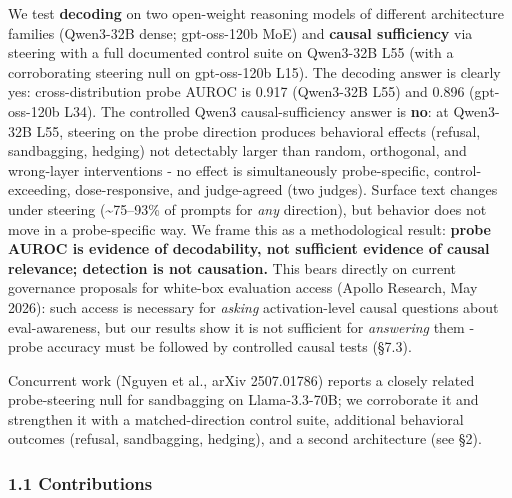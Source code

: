 \documentclass[
]{article}
\begin{document}
We test \textbf{decoding} on two open-weight reasoning models of
different architecture families (Qwen3-32B dense; gpt-oss-120b MoE) and
\textbf{causal sufficiency} via steering with a full documented control
suite on Qwen3-32B L55 (with a corroborating steering null on
gpt-oss-120b L15). The decoding answer is clearly yes:
cross-distribution probe AUROC is 0.917 (Qwen3-32B L55) and 0.896
(gpt-oss-120b L34). The controlled Qwen3 causal-sufficiency answer is
\textbf{no}: at Qwen3-32B L55, steering on the probe direction produces
behavioral effects (refusal, sandbagging, hedging) not detectably larger
than random, orthogonal, and wrong-layer interventions - no effect is
simultaneously probe-specific, control-exceeding, dose-responsive, and
judge-agreed (two judges). Surface text changes under steering
(\textasciitilde75--93\% of prompts for \emph{any} direction), but
behavior does not move in a probe-specific way. We frame this as a
methodological result: \textbf{probe AUROC is evidence of decodability,
not sufficient evidence of causal relevance; detection is not
causation.} This bears directly on current governance proposals for
white-box evaluation access (Apollo Research, May 2026): such access is
necessary for \emph{asking} activation-level causal questions about
eval-awareness, but our results show it is not sufficient for
\emph{answering} them - probe accuracy must be followed by controlled
causal tests (§7.3).

Concurrent work (Nguyen et al., arXiv 2507.01786) reports a closely
related probe-steering null for sandbagging on Llama-3.3-70B; we
corroborate it and strengthen it with a matched-direction control suite,
additional behavioral outcomes (refusal, sandbagging, hedging), and a
second architecture (see \S2).

\subsubsection{1.1 Contributions}\label{contributions}
\end{document}
